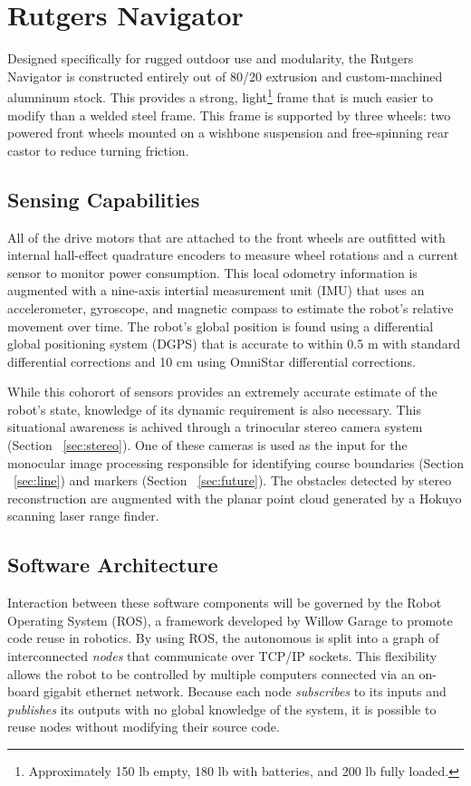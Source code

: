 \documentclass[11pt,twocolumn]{article}
\begin{document}
\section{Rutgers Navigator}
\label{sec:robot}
Designed specifically for rugged outdoor use and modularity, the Rutgers
Navigator is constructed entirely out of 80/20 extrusion and custom-machined
alumninum stock. This provides a strong, light\footnote{Approximately 150 lb
empty, 180 lb with batteries, and 200 lb fully loaded.} frame that is much
easier to modify than a welded steel frame. This frame is supported by three
wheels: two powered front wheels mounted on a wishbone suspension and
free-spinning rear castor to reduce turning friction.

\subsection{Sensing Capabilities}
\label{sec:robot-sensors}
All of the drive motors that are attached to the front wheels are outfitted
with internal hall-effect quadrature encoders to measure wheel rotations and a
current sensor to monitor power consumption. This local odometry information is
augmented with a nine-axis intertial measurement unit (IMU) that uses an
accelerometer, gyroscope, and magnetic compass to estimate the robot's relative
movement over time. The robot's global position is found using a differential
global positioning system (DGPS) that is accurate to within 0.5 m with standard
differential corrections and 10 cm using OmniStar differential corrections.

While this cohorort of sensors provides an extremely accurate estimate of the
robot's state, knowledge of its dynamic requirement is also necessary. This
situational awareness is achived through a trinocular stereo camera system 
(Section ~\ref{sec:stereo}). One of these cameras is used as the input for
the monocular image processing responsible for identifying course boundaries
(Section ~\ref{sec:line}) and markers (Section ~\ref{sec:future}). The obstacles
detected by stereo reconstruction are augmented with the planar point cloud
generated by a Hokuyo scanning laser range finder.

\subsection{Software Architecture}
\label{sec:robot-software}
Interaction between these software components will be governed by the Robot
Operating System (ROS), a framework developed by Willow Garage to promote code
reuse in robotics. By using ROS, the autonomous is split into a graph of
interconnected \textit{nodes} that communicate over TCP/IP sockets. This
flexibility allows the robot to be controlled by multiple computers connected
via an on-board gigabit ethernet network. Because each node \textit{subscribes}
to its inputs and \textit{publishes} its outputs with no global knowledge of
the system, it is possible to reuse nodes without modifying their source code.
\end{document}
